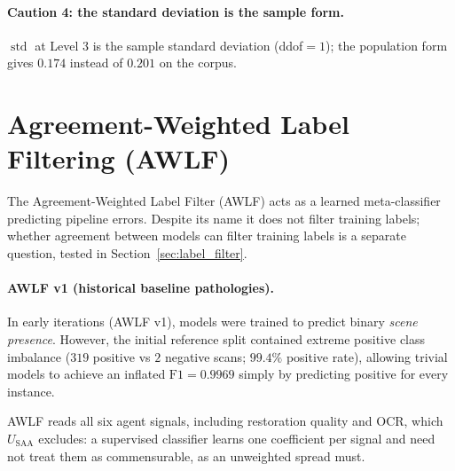 \documentclass[12pt,a4paper]{report}
\begin{document}
\paragraph{Caution 4: the standard deviation is the sample form.}
$\operatorname{std}$ at Level 3 is the sample standard deviation (ddof$=1$); the population form gives $0.174$ instead of $0.201$ on the corpus.

\section{Agreement-Weighted Label Filtering (AWLF)}
\label{sec:awlf}
The Agreement-Weighted Label Filter (AWLF) acts as a learned meta-classifier predicting pipeline errors. Despite its name it does not filter training labels; whether agreement between models can filter training labels is a separate question, tested in Section~\ref{sec:label_filter}. 

\paragraph{AWLF v1 (historical baseline pathologies).} In early iterations (AWLF v1), models were trained to predict binary \textit{scene presence}. However, the initial reference split contained extreme positive class imbalance ($319$ positive vs $2$ negative scans; $99.4\%$ positive rate), allowing trivial models to achieve an inflated $\text{F1}=0.9969$ simply by predicting positive for every instance. 

AWLF reads all six agent signals, including restoration quality and OCR, which $U_{\text{SAA}}$ excludes: a supervised classifier learns one coefficient per signal and need not treat them as commensurable, as an unweighted spread must.
\end{document}
